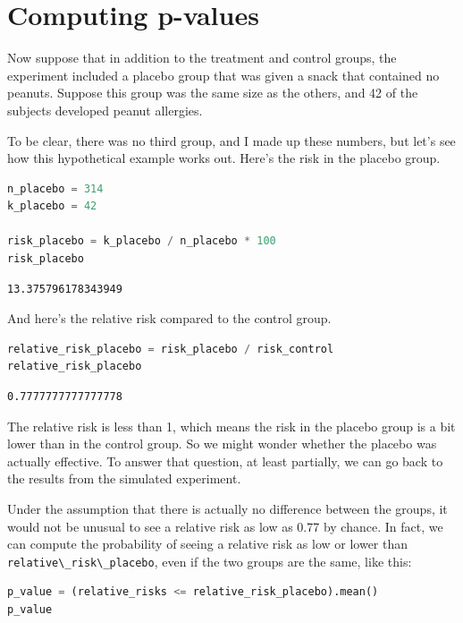 \section{Computing p-values}\label{computing-p-values}

Now suppose that in addition to the treatment and control groups, the
experiment included a placebo group that was given a snack that
contained no peanuts. Suppose this group was the same size as the
others, and 42 of the subjects developed peanut allergies.

To be clear, there was no third group, and I made up these numbers, but
let's see how this hypothetical example works out. Here's the risk in
the placebo group.

\begin{lstlisting}[language=Python,style=source]
n_placebo = 314
k_placebo = 42

risk_placebo = k_placebo / n_placebo * 100
risk_placebo
\end{lstlisting}

\begin{lstlisting}[style=output]
13.375796178343949
\end{lstlisting}

And here's the relative risk compared to the control group.

\begin{lstlisting}[language=Python,style=source]
relative_risk_placebo = risk_placebo / risk_control
relative_risk_placebo
\end{lstlisting}

\begin{lstlisting}[style=output]
0.7777777777777778
\end{lstlisting}

The relative risk is less than 1, which means the risk in the placebo
group is a bit lower than in the control group. So we might wonder
whether the placebo was actually effective. To answer that question, at
least partially, we can go back to the results from the simulated
experiment.

Under the assumption that there is actually no difference between the
groups, it would not be unusual to see a relative risk as low as 0.77 by
chance. In fact, we can compute the probability of seeing a relative
risk as low or lower than
\passthrough{\lstinline!relative\_risk\_placebo!}, even if the two
groups are the same, like this:

\begin{lstlisting}[language=Python,style=source]
p_value = (relative_risks <= relative_risk_placebo).mean()
p_value
\end{lstlisting}

